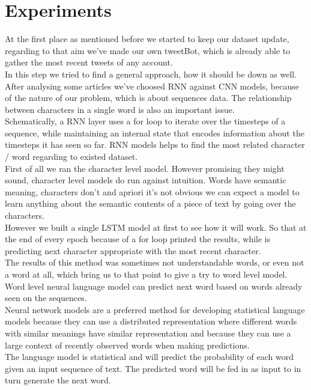 \documentclass[conference]{IEEEtran}
\begin{document}
\section{Experiments}

At the first place as mentioned before we started to keep our dataset update, regarding to that aim we’ve made our own tweetBot, which is already able to gather the most recent tweets of any account.\\
In this step we tried to find a general approach, how it should be down as well. After analysing some articles we’ve choosed RNN against CNN models, because of the nature of our problem, which is about sequences data. The relationship between characters in a single word is also an important issue.\\
Schematically, a RNN layer uses a for loop to iterate over the timesteps of a sequence, while maintaining an internal state that encodes information about the timesteps it has seen so far. RNN models helps to find the most related character / word regarding to existed dataset.\\
First of all we ran the character level model. However promising they might sound, character level models do run against intuition. Words have semantic meaning, characters don't and apriori it's not obvious we can expect a model to learn anything about the semantic contents of a piece of text by going over the characters.\\
However we built a single LSTM model at first to see how it will work. So that at the end of every epoch because of a for loop printed the results, while is predicting next character appropriate with the most recent character.\\
The results of this method was sometimes not understandable words, or even not a word at all, which bring us to that point to give a try to word level model.\\
Word level neural language model can predict next word based on words already seen on the sequences.\\
Neural network models are a preferred method for developing statistical language models because they can use a distributed representation where different words with similar meanings have similar representation and because they can use a large context of recently observed words when making predictions.\\
The language model is statistical and will predict the probability of each word given an input sequence of text. The predicted word will be fed in as input to in turn generate the next word.\\
\end{document}
